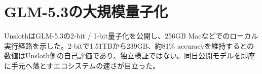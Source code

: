 \section{GLM-5.3の大規模量子化}
UnslothはGLM-5.3の2-bit / 1-bit量子化を公開し、256GB Macなどでのローカル実行経路を示した。2-bitで1.51TBから239GB、約81\% accuracyを維持するとの数値はUnsloth側の自己評価であり、独立検証ではない。同日公開モデルを即座に手元へ落とすエコシステムの速さが目立った。
